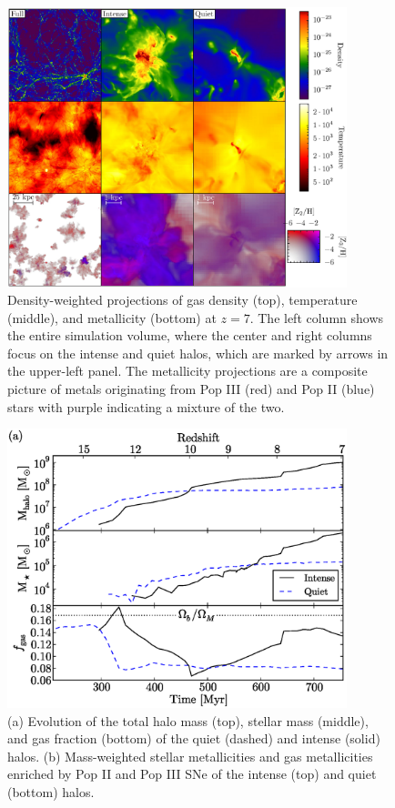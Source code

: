 \documentclass[12pt]{article}
\begin{document}
\clearpage
\begin{figure}
\includegraphics[width=0.88\textwidth]{f3.eps}
  \caption{\label{fig:projections} Density-weighted projections of gas
    density (top), temperature (middle), and metallicity (bottom) at
    $z=7$.  The left column shows the entire simulation volume, where
    the center and right columns focus on the intense and quiet halos,
    which are marked by arrows in the upper-left panel.  The
    metallicity projections are a composite picture of metals
    originating from Pop III (red) and Pop II (blue) stars with purple
    indicating a mixture of the two.}
\end{figure}

\clearpage
\begin{figure}
\includegraphics[width=0.88\textwidth]{f1.eps}
  \caption{\label{fig:evo} (a) Evolution of the total halo
    mass (top), stellar mass (middle), and gas fraction (bottom) of
    the quiet (dashed) and intense (solid) halos.  (b)
    Mass-weighted stellar metallicities and gas metallicities enriched
    by Pop II and Pop III SNe of the intense (top) and quiet (bottom)
    halos.}
\end{figure}
\end{document}

